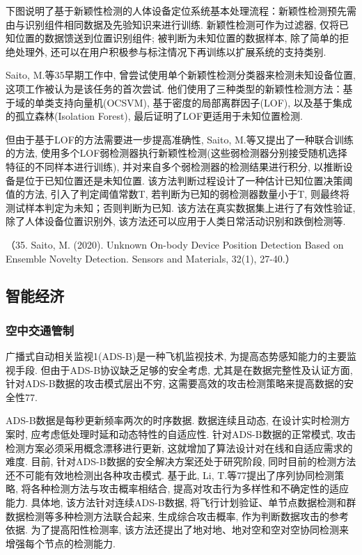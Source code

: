 \documentclass{Style/aas}
\begin{document}
\begin{multicols}{2}
  下图说明了基于新颖性检测的人体设备定位系统基本处理流程：新颖性检测预先需由与识别组件相同数据及先验知识来进行训练. 新颖性检测可作为过滤器, 仅将已知位置的数据馈送到位置识别组件; 被判断为未知位置的数据样本, 除了简单的拒绝处理外, 还可以在用户积极参与标注情况下再训练以扩展系统的支持类别.

  Saito, M.等35早期工作中, 曾尝试使用单个新颖性检测分类器来检测未知设备位置, 这项工作被认为是该任务的首次尝试. 他们使用了三种类型的新颖性检测方法：基于域的单类支持向量机(OCSVM), 基于密度的局部离群因子(LOF), 以及基于集成的孤立森林(Isolation Forest), 最后证明了LOF更适用于未知位置检测.

  但由于基于LOF的方法需要进一步提高准确性, Saito, M.等又提出了一种联合训练的方法, 使用多个LOF弱检测器执行新颖性检测(这些弱检测器分别接受随机选择特征的不同样本进行训练), 并对来自多个弱检测器的检测结果进行积分, 以推断设备是位于已知位置还是未知位置. 该方法判断过程设计了一种估计已知位置决策阈值的方法, 引入了判定阈值常数T, 若判断为已知的弱检测器数量小于T, 则最终将测试样本判定为未知；否则判断为已知. 该方法在真实数据集上进行了有效性验证, 除了人体设备位置识别外, 该方法还可以应用于人类日常活动识别和跌倒检测等.

  （35.	Saito, M. (2020). Unknown On-body Device Position Detection Based on Ensemble Novelty Detection. Sensors and Materials, 32(1), 27-40.）

  \subsection{智能经济}
  \subsubsection{空中交通管制}
  广播式自动相关监视1(ADS-B)是一种飞机监视技术, 为提高态势感知能力的主要监视手段. 但由于ADS-B协议缺乏足够的安全考虑, 尤其是在数据完整性及认证方面,  针对ADS-B数据的攻击模式层出不穷, 这需要高效的攻击检测策略来提高数据的安全性77. 

  ADS-B数据是每秒更新频率两次的时序数据. 数据连续且动态, 在设计实时检测方案时, 应考虑低处理时延和动态特性的自适应性. 针对ADS-B数据的正常模式, 攻击检测方案必须采用概念漂移进行更新, 这就增加了算法设计对在线和自适应需求的难度. 目前, 针对ADS-B数据的安全解决方案还处于研究阶段, 同时目前的检测方法还不可能有效地检测出各种攻击模式. 基于此, Li, T.等77提出了序列协同检测策略, 将各种检测方法与攻击概率相结合, 提高对攻击行为多样性和不确定性的适应能力. 具体地, 该方法针对连续ADS-B数据, 将飞行计划验证、单节点数据检测和群数据检测等多种检测方法联合起来, 生成综合攻击概率, 作为判断数据攻击的参考依据. 为了提高阳性检测率, 该方法还提出了地对地、地对空和空对空协同检测来增强每个节点的检测能力. 


\end{multicols}
\end{document}
